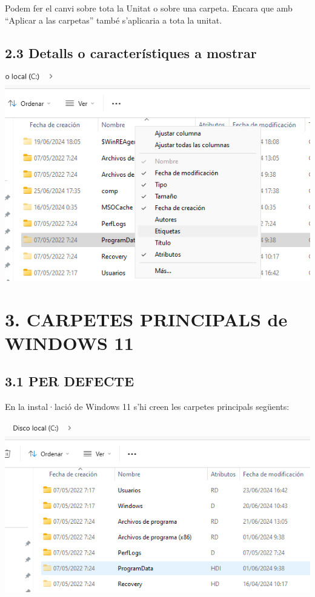 \documentclass[
  a4paper,
]{article}
\begin{document}
Podem fer el canvi sobre tota la Unitat o sobre una carpeta. Encara que
amb ``Aplicar a las carpetas'' també s'aplicaria a tota la unitat.

\subsection{2.3 Detalls o característiques a
mostrar}\label{detalls-o-caracteruxedstiques-a-mostrar}

\includegraphics{png/verVistaDetalle.png}

\section{3. CARPETES PRINCIPALS de WINDOWS
11}\label{carpetes-principals-de-windows-11}

\subsection{3.1 PER DEFECTE}\label{per-defecte}

En la instal·lació de Windows 11 s'hi creen les carpetes principals
següents:

\includegraphics{png/carpetesPrincipals.png}
\end{document}
